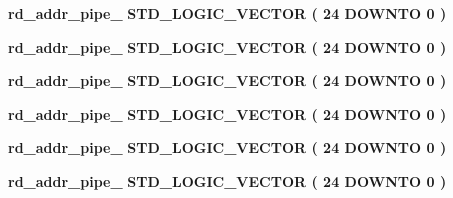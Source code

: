\begin{DoxyCompactItemize}
\item 
{\bf rd\+\_\+addr\+\_\+pipe\+\_} {\bfseries \textcolor{comment}{S\+T\+D\+\_\+\+L\+O\+G\+I\+C\+\_\+\+V\+E\+C\+T\+OR}\textcolor{vhdlchar}{ }\textcolor{vhdlchar}{(}\textcolor{vhdlchar}{ }\textcolor{vhdlchar}{ } \textcolor{vhdldigit}{24} \textcolor{vhdlchar}{ }\textcolor{keywordflow}{D\+O\+W\+N\+TO}\textcolor{vhdlchar}{ }\textcolor{vhdlchar}{ } \textcolor{vhdldigit}{0} \textcolor{vhdlchar}{ }\textcolor{vhdlchar}{)}\textcolor{vhdlchar}{ }} 
\item 
{\bf rd\+\_\+addr\+\_\+pipe\+\_} {\bfseries \textcolor{comment}{S\+T\+D\+\_\+\+L\+O\+G\+I\+C\+\_\+\+V\+E\+C\+T\+OR}\textcolor{vhdlchar}{ }\textcolor{vhdlchar}{(}\textcolor{vhdlchar}{ }\textcolor{vhdlchar}{ } \textcolor{vhdldigit}{24} \textcolor{vhdlchar}{ }\textcolor{keywordflow}{D\+O\+W\+N\+TO}\textcolor{vhdlchar}{ }\textcolor{vhdlchar}{ } \textcolor{vhdldigit}{0} \textcolor{vhdlchar}{ }\textcolor{vhdlchar}{)}\textcolor{vhdlchar}{ }} 
\item 
{\bf rd\+\_\+addr\+\_\+pipe\+\_} {\bfseries \textcolor{comment}{S\+T\+D\+\_\+\+L\+O\+G\+I\+C\+\_\+\+V\+E\+C\+T\+OR}\textcolor{vhdlchar}{ }\textcolor{vhdlchar}{(}\textcolor{vhdlchar}{ }\textcolor{vhdlchar}{ } \textcolor{vhdldigit}{24} \textcolor{vhdlchar}{ }\textcolor{keywordflow}{D\+O\+W\+N\+TO}\textcolor{vhdlchar}{ }\textcolor{vhdlchar}{ } \textcolor{vhdldigit}{0} \textcolor{vhdlchar}{ }\textcolor{vhdlchar}{)}\textcolor{vhdlchar}{ }} 
\item 
{\bf rd\+\_\+addr\+\_\+pipe\+\_} {\bfseries \textcolor{comment}{S\+T\+D\+\_\+\+L\+O\+G\+I\+C\+\_\+\+V\+E\+C\+T\+OR}\textcolor{vhdlchar}{ }\textcolor{vhdlchar}{(}\textcolor{vhdlchar}{ }\textcolor{vhdlchar}{ } \textcolor{vhdldigit}{24} \textcolor{vhdlchar}{ }\textcolor{keywordflow}{D\+O\+W\+N\+TO}\textcolor{vhdlchar}{ }\textcolor{vhdlchar}{ } \textcolor{vhdldigit}{0} \textcolor{vhdlchar}{ }\textcolor{vhdlchar}{)}\textcolor{vhdlchar}{ }} 
\item 
{\bf rd\+\_\+addr\+\_\+pipe\+\_} {\bfseries \textcolor{comment}{S\+T\+D\+\_\+\+L\+O\+G\+I\+C\+\_\+\+V\+E\+C\+T\+OR}\textcolor{vhdlchar}{ }\textcolor{vhdlchar}{(}\textcolor{vhdlchar}{ }\textcolor{vhdlchar}{ } \textcolor{vhdldigit}{24} \textcolor{vhdlchar}{ }\textcolor{keywordflow}{D\+O\+W\+N\+TO}\textcolor{vhdlchar}{ }\textcolor{vhdlchar}{ } \textcolor{vhdldigit}{0} \textcolor{vhdlchar}{ }\textcolor{vhdlchar}{)}\textcolor{vhdlchar}{ }} 
\item 
{\bf rd\+\_\+addr\+\_\+pipe\+\_} {\bfseries \textcolor{comment}{S\+T\+D\+\_\+\+L\+O\+G\+I\+C\+\_\+\+V\+E\+C\+T\+OR}\textcolor{vhdlchar}{ }\textcolor{vhdlchar}{(}\textcolor{vhdlchar}{ }\textcolor{vhdlchar}{ } \textcolor{vhdldigit}{24} \textcolor{vhdlchar}{ }\textcolor{keywordflow}{D\+O\+W\+N\+TO}\textcolor{vhdlchar}{ }\textcolor{vhdlchar}{ } \textcolor{vhdldigit}{0} \textcolor{vhdlchar}{ }\textcolor{vhdlchar}{)}\textcolor{vhdlchar}{ }} 

\end{DoxyCompactItemize}
